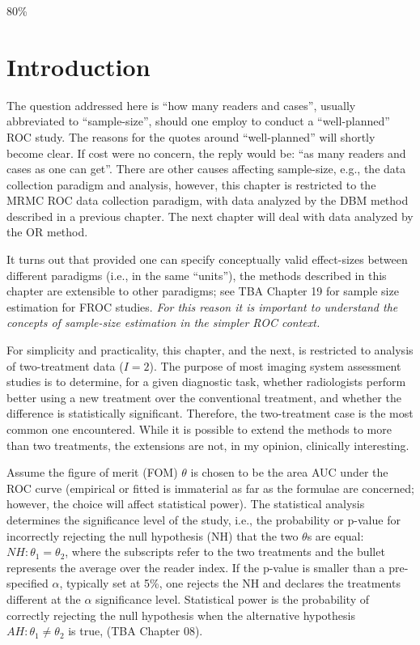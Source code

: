\documentclass[
]{book}
\begin{document}
80\%

\hypertarget{roc-sample-size-dbm-introduction}{%
\section{Introduction}\label{roc-sample-size-dbm-introduction}}

The question addressed here is ``how many readers and cases'', usually abbreviated to ``sample-size'', should one employ to conduct a ``well-planned'' ROC study. The reasons for the quotes around ``well-planned'' will shortly become clear. If cost were no concern, the reply would be: ``as many readers and cases as one can get''. There are other causes affecting sample-size, e.g., the data collection paradigm and analysis, however, this chapter is restricted to the MRMC ROC data collection paradigm, with data analyzed by the DBM method described in a previous chapter. The next chapter will deal with data analyzed by the OR method.

It turns out that provided one can specify conceptually valid effect-sizes between different paradigms (i.e., in the same ``units''), the methods described in this chapter are extensible to other paradigms; see TBA Chapter 19 for sample size estimation for FROC studies. \emph{For this reason it is important to understand the concepts of sample-size estimation in the simpler ROC context.}

For simplicity and practicality, this chapter, and the next, is restricted to analysis of two-treatment data (\(I = 2\)). The purpose of most imaging system assessment studies is to determine, for a given diagnostic task, whether radiologists perform better using a new treatment over the conventional treatment, and whether the difference is statistically significant. Therefore, the two-treatment case is the most common one encountered. While it is possible to extend the methods to more than two treatments, the extensions are not, in my opinion, clinically interesting.

Assume the figure of merit (FOM) \(\theta\) is chosen to be the area AUC under the ROC curve (empirical or fitted is immaterial as far as the formulae are concerned; however, the choice will affect statistical power). The statistical analysis determines the significance level of the study, i.e., the probability or p-value for incorrectly rejecting the null hypothesis (NH) that the two \(\theta\)s are equal: \(NH: \theta_1 = \theta_2\), where the subscripts refer to the two treatments and the bullet represents the average over the reader index. If the p-value is smaller than a pre-specified \(\alpha\), typically set at 5\%, one rejects the NH and declares the treatments different at the \(\alpha\) significance level. Statistical power is the probability of correctly rejecting the null hypothesis when the alternative hypothesis \(AH: \theta_1 \neq \theta_2\) is true, (TBA Chapter 08).
\end{document}
